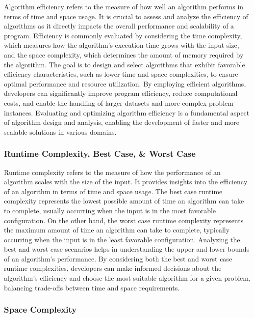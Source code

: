 Algorithm efficiency refers to the measure of how well an algorithm performs in terms of time and space usage. It is crucial to assess and analyze the efficiency of algorithms as it directly impacts the overall performance and scalability of a program. Efficiency is commonly evaluated by considering the time complexity, which measures how the algorithm's execution time grows with the input size, and the space complexity, 
which determines the amount of memory required by the algorithm. The goal is to design and select algorithms that exhibit favorable efficiency characteristics, such as lower time and space complexities, to ensure optimal performance and resource utilization. By employing efficient algorithms, developers can significantly improve program efficiency, reduce computational costs, and enable the handling of larger datasets and 
more complex problem instances. Evaluating and optimizing algorithm efficiency is a fundamental aspect of algorithm design and analysis, enabling the development of faster and more scalable solutions in various domains.

\subsubsection*{Runtime Complexity, Best Case, \& Worst Case}

Runtime complexity refers to the measure of how the performance of an algorithm scales with the size of the input. It provides insights into the efficiency of an algorithm in terms of time and space usage. The best case runtime complexity represents the lowest possible amount of time an algorithm can take to complete, usually occurring when the input is in the most favorable configuration. On the other hand, the worst case 
runtime complexity represents the maximum amount of time an algorithm can take to complete, typically occurring when the input is in the least favorable configuration. Analyzing the best and worst case scenarios helps in understanding the upper and lower bounds of an algorithm's performance. By considering both the best and worst case runtime complexities, developers can make informed decisions about the algorithm's efficiency 
and choose the most suitable algorithm for a given problem, balancing trade-offs between time and space requirements.

\subsubsection*{Space Complexity}

